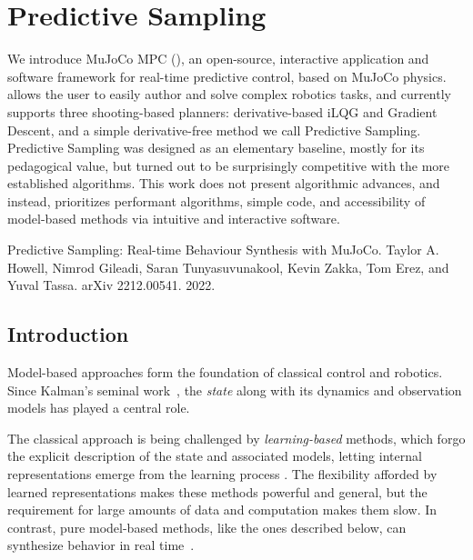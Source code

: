 \chapter{Predictive Sampling}
We introduce MuJoCo MPC (\app{}), an open-source, interactive application and software framework for real-time predictive control, based on MuJoCo physics. \app{} allows the user to easily author and solve complex robotics tasks, and currently supports three shooting-based planners: derivative-based iLQG and Gradient Descent, and a simple derivative-free method we call Predictive Sampling. Predictive Sampling was designed as an elementary baseline, mostly for its pedagogical value, but turned out to be surprisingly competitive with the more established algorithms. This work does not present algorithmic advances, and instead, prioritizes performant algorithms, simple code, and accessibility of model-based methods via intuitive and interactive software. 


\vspace*{\fill}

\noindent Predictive Sampling: Real-time Behaviour Synthesis with MuJoCo. Taylor A. Howell, Nimrod Gileadi, Saran Tunyasuvunakool, Kevin Zakka, Tom Erez, and Yuval Tassa. arXiv 2212.00541. 2022.

\pagebreak

\section{Introduction}

Model-based approaches form the foundation of classical control and robotics. Since Kalman's seminal work~\cite{kalman1960general}, the \emph{state} along with its dynamics and observation models has played a central role. 

The classical approach is being challenged by \textit{learning-based} methods, which forgo the explicit description of the state and associated models, letting internal representations emerge from the learning process \cite{lillicrap2015continuous, schulman2017proximal, salimans2017evolution, smith2022walk, rudin2022learning}. The flexibility afforded by learned representations makes these methods powerful and general, but the requirement for large amounts of data and computation makes them slow. In contrast, pure model-based methods, like the ones described below, can synthesize behavior in real time~\cite{tassa2014control}.

